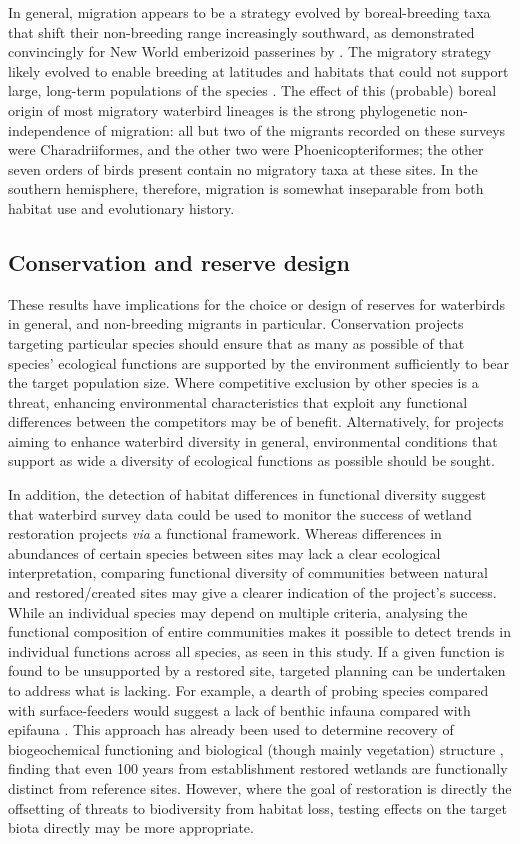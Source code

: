 \documentclass[12pt,a4paper]{book}
\begin{document}
In general, migration appears to be a strategy evolved by boreal-breeding taxa that shift their non-breeding range increasingly southward, as demonstrated convincingly for New World emberizoid passerines by \citet{Winger2014}. The migratory strategy likely evolved to enable breeding at latitudes and habitats that could not support large, long-term populations of the species \citep[Chapter 20]{Newton2008}. The effect of this (probable) boreal origin of most migratory waterbird lineages is the strong phylogenetic non-independence of migration: all but two of the migrants recorded on these surveys were Charadriiformes, and the other two were Phoenicopteriformes; the other seven orders of birds present contain no migratory taxa at these sites. In the southern hemisphere, therefore, migration is somewhat inseparable from both habitat use and evolutionary history.

\subsection{Conservation and reserve design}
These results have implications for the choice or design of reserves for waterbirds in general, and non-breeding migrants in particular. Conservation projects targeting particular species should ensure that as many as possible of that species' ecological functions are supported by the environment sufficiently to bear the target population size. Where competitive exclusion by other species is a threat, enhancing environmental characteristics that exploit any functional differences between the competitors  may be of benefit. Alternatively, for projects aiming to enhance waterbird diversity in general, environmental conditions that support as wide a diversity of ecological functions as possible should be sought.

In addition, the detection of habitat differences in functional diversity suggest that waterbird survey data could be used to monitor the success of wetland restoration projects \textit{via} a functional framework. Whereas differences in abundances of certain species between sites may lack a clear ecological interpretation, comparing functional diversity of communities between natural and restored/created sites may give a clearer indication of the project's success. While an individual species may depend on multiple criteria, analysing the functional composition of entire communities makes it possible to detect trends in individual functions across all species, as seen in this study. If a given function is found to be unsupported by a restored site, targeted planning can be undertaken to address what is lacking. For example, a dearth of probing species compared with surface-feeders would suggest a lack of benthic infauna compared with epifauna \citep{McLusky2004}. This approach has already been used to determine recovery of biogeochemical functioning and biological (though mainly vegetation) structure \citep{Moreno-Mateos2012}, finding that even 100 years from establishment restored wetlands are functionally distinct from reference sites. However, where the goal of restoration is directly the offsetting of threats to biodiversity from habitat loss, testing effects on the target biota directly may be more appropriate.
\end{document}
